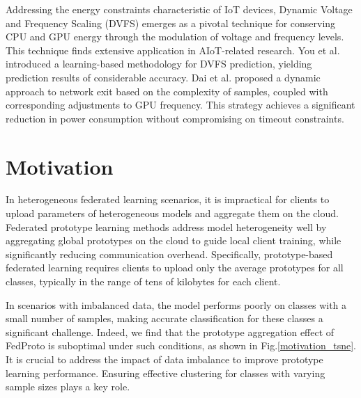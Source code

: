 \documentclass[journal]{IEEEtran}
\begin{document}
Addressing the energy constraints characteristic of IoT devices, Dynamic Voltage and Frequency Scaling (DVFS) emerges as a pivotal technique for conserving CPU and GPU energy through the modulation of voltage and frequency levels. This technique finds extensive application in AIoT-related research. You et al. \cite{you2023zeus} introduced a learning-based methodology for DVFS prediction, yielding prediction results of considerable accuracy. Dai et al.\cite{dai2024energy} proposed a dynamic approach to network exit based on the complexity of samples, coupled with corresponding adjustments to GPU frequency. This strategy achieves a significant reduction in power consumption without compromising on timeout constraints.


\section{Motivation}
In heterogeneous federated learning scenarios, it is impractical for clients to upload parameters of heterogeneous models and aggregate them on the cloud. Federated prototype learning methods address model heterogeneity well by aggregating global prototypes on the cloud to guide local client training, while significantly reducing communication overhead. Specifically, prototype-based federated learning requires clients to upload only the average prototypes for all classes, typically in the range of tens of kilobytes for each client. 

In scenarios with imbalanced data, the model performs poorly on classes with a small number of samples, making accurate classification for these classes a significant challenge. Indeed, we find that the prototype aggregation effect of FedProto\cite{tan_fedproto_2021} is suboptimal under such conditions, as shown in Fig.\ref{motivation_tsne}. It is crucial to address the impact of data imbalance to improve prototype learning performance. Ensuring effective clustering for classes with varying sample sizes plays a key role.
\end{document}
